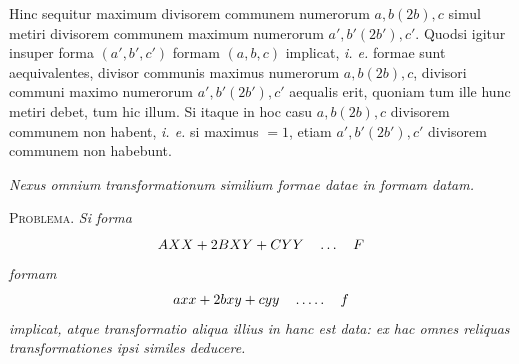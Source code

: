 Hinc sequitur maximum divisorem communem numerorum \(a,b(2b),c\) simul metiri divisorem communem maximum numerorum \(a',b'(2b'),c'\). Quodsi igitur insuper forma \((a',b',c')\) formam \((a,b,c)\) implicat, \textit{i. e.} formae sunt aequivalentes, divisor communis maximus numerorum \(a,b(2b),c\), divisori communi maximo numerorum \(a',b'(2b'),c'\) aequalis erit, quoniam tum ille hunc metiri debet, tum hic illum. Si itaque in hoc casu \(a,b(2b),c\) divisorem communem non habent, \textit{i. e.} si maximus \(=1\), etiam \(a',b'(2b'),c'\) divisorem communem non habebunt.

\begin{center}
\textit{Nexus omnium transformationum similium formae datae in formam datam.}
\end{center}
\textsc{Problema.} \textit{Si forma}
\[
AXX+2BXY+CYY\quad\mathinner{.\,.\,.}\quad F
\]
\textit{formam}
\[
axx+2bxy+cyy\quad\mathinner{.\,.\,.\,.\,.}\quad f
\]
\textit{implicat, atque transformatio aliqua illius in hanc est data: ex hac omnes reliquas transformationes ipsi similes deducere.}

